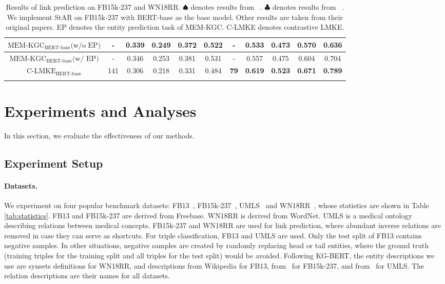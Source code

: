 \documentclass{article}
\begin{document}
\begin{table*}[htbp]
{\begin{tabular}{|c|c|c|c|c|c|c|c|c|c|c|}
        $\text{MEM-KGC}_{\text{BERT-base}}\text{(w/o EP)}$ & - & 0.339 & 0.249 & 0.372 & 0.522 & - & 0.533 & 0.473 & 0.570 & 0.636 \\ \hline
        $\text{MEM-KGC}_{\text{BERT-base}}\text{(w/ EP)}$ & - & 0.346 & 0.253 & 0.381 & 0.531 & - & 0.557 & 0.475 & 0.604 & 0.704 \\ \hline
$\text{C-LMKE}_{\text{BERT-base}}$  & 141 & 0.306 & 0.218 & 0.331 & 0.484 & \textbf{79} & \textbf{0.619} & \textbf{0.523} & \textbf{0.671} & \textbf{0.789} \\ 
    \Xhline{0.8pt}
    \end{tabular}}
    \caption{Results of link prediction on FB15k-237 and WN18RR.
    ${\spadesuit}$ denotes results from ~\protect\cite{sun2019rotate}.
    ${\clubsuit}$ denotes results from ~\protect\cite{wang2021star}.
    We implement StAR on FB15k-237 with BERT-base as the base model.
    Other results are taken from their original papers.
    EP denotes the entity prediction task of MEM-KGC. 
    C-LMKE denotes contrastive LMKE.}
    \label{tab:main_exp}
\end{table*}



\section{Experiments and Analyses}


In this section, we evaluate the effectiveness of our methods. 

\subsection{Experiment Setup}




\paragraph{\textbf{Datasets.}}  
We experiment on four popular benchmark datasets: 
FB13~\cite{socher2013ntn}, 
FB15k-237~\cite{toutanova2015fb15k237}, UMLS~\cite{dettmers2018wn18rr} and WN18RR~\cite{dettmers2018wn18rr}, whose statistics are shown in Table \ref{tab:statistics}.
FB13 and FB15k-237 are derived from Freebase.
WN18RR is derived from WordNet. 
UMLS is a medical ontology describing relations between medical concepts. 
FB15k-237 and WN18RR are used for link prediction, where abundant inverse relations are removed in case they can serve as shortcuts. 
For triple classification, FB13 and UMLS are used.
Only the test split of FB13 contains negative samples.
In other situations, negative samples are created by randomly replacing head or tail entities, where the ground truth (training triples for the training split and all triples for the test split) would be avoided. 
Following KG-BERT, the entity descriptions we use are 
synsets definitions for WN18RR, and descriptions from Wikipedia for FB13, from~\cite{xie2016dkrl} for FB15k-237, and from~\cite{yao2019kgbert} for UMLS. 
The relation descriptions are their names for all datasets. 
\end{document}

